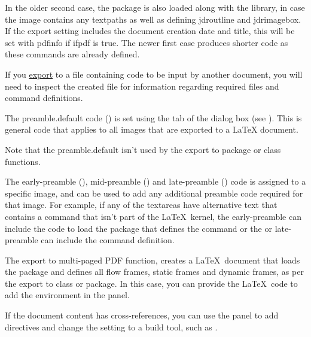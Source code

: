In the older second case, the  package is also loaded
along with the   library, in
case the image contains any \glspl{textpath} as well as defining
\gls{jdroutline} and \gls{jdrimagebox}.
If the export setting includes the document creation date and
title, this will be set with \gls{pdfinfo} if \gls{ifpdf} is true.
The newer first case 
produces shorter code as these commands are already defined.

\begin{information}
If you \hyperref[sec:exportpgf]{export} to a file containing 
code to be input by another document, you will need to inspect the 
created  file for information regarding required files and
command definitions.
\end{information}

The \gls{preamble.default} code () is set using the
 tab of the  dialog
box (see ). This is general code
that applies to all images that are exported to a LaTeX document.

\begin{information}
Note that the \gls{preamble.default} isn't used by the export to package
or class functions.
\end{information}

The \gls{early-preamble} (), 
\gls{mid-preamble} () and \gls{late-preamble}
() code is assigned to a specific image, and can
be used to add any additional \gls{preamble} code required for that image.
For example, if any of the \glspl{textarea} have alternative text
that contains a command that isn't part of the \LaTeX\ kernel, the
\gls{early-preamble} can include the code to load the package that defines
the command or the  or \gls{late-preamble} can include the command
definition.

The export to multi-paged PDF function, creates a \LaTeX\ document
that loads the  package and defines all flow frames,
static frames and dynamic frames, as per the export to class or
package. In this case, you can provide the \LaTeX\ code to add the
 environment in the
 panel.

If the document content has cross-references, you can use the
 panel to add
\glspl{directive} and change the  setting
to a build tool, such as .

